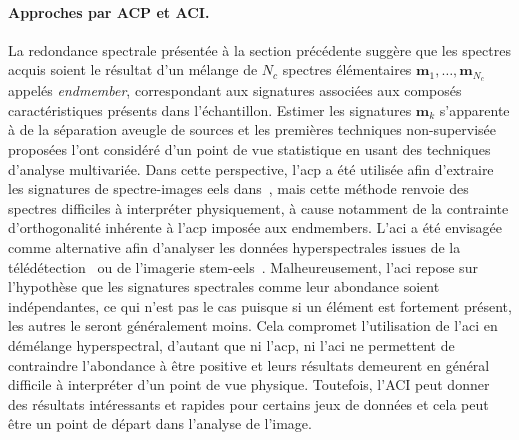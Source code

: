     \paragraph{Approches par ACP et ACI.} La redondance spectrale présentée à la section précédente suggère que les spectres acquis soient le résultat d'un mélange de $N_c$ spectres élémentaires $\mathbf{m}_1,\dots,\mathbf{m}_{N_c}$ appelés \emph{endmember}, correspondant aux signatures associées aux composés caractéristiques présents dans l'échantillon.
    Estimer les signatures $\mathbf{m}_k$ s'apparente à de la séparation aveugle de sources et les premières techniques non-supervisée proposées l'ont considéré d'un point de vue statistique en usant des techniques d'analyse multivariée. Dans cette perspective, l'\gls{acp} a été utilisée afin d'extraire les signatures de spectre-images \gls{eels} dans~\cite{bonnet1999extracting, bosman2006mapping, trebbia1990eels}, mais cette méthode renvoie des spectres difficiles à interpréter physiquement, à cause notamment de la contrainte d'orthogonalité inhérente à l'\gls{acp} imposée aux endmembers. L'\gls{aci} a été envisagée comme alternative afin d'analyser les données hyperspectrales issues de la télédétection~\cite{bayliss1998analyzing, chen1999independent} ou de l'imagerie \gls{stem}-\gls{eels}~\cite{delapena2011mapping, bonnet2005independent, bosman2006mapping}. Malheureusement, l'\gls{aci} repose sur l'hypothèse que les signatures spectrales comme leur abondance soient indépendantes, ce qui n'est pas le cas puisque si un élément est fortement présent, les autres le seront généralement moins. Cela compromet l'utilisation de l'\gls{aci} en démélange hyperspectral, d'autant que ni l'\gls{acp}, ni l'\gls{aci} ne permettent de contraindre l'abondance à être positive et leurs résultats demeurent en général difficile à interpréter d'un point de vue physique. Toutefois, l'ACI peut donner des résultats intéressants et rapides pour certains jeux de données et cela peut être un point de départ dans l'analyse de l'image.
    
